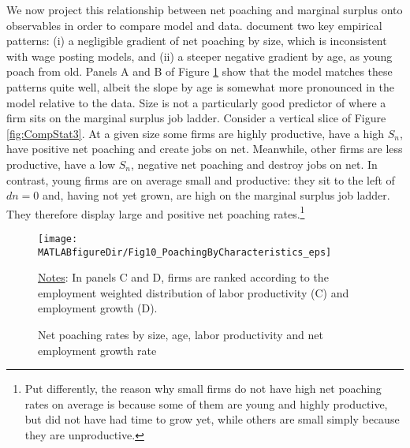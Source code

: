 We now project this relationship between net poaching and marginal surplus onto observables in order to compare model and data.
\citet{HHKM2018} document two key empirical patterns: (i) a negligible gradient of net poaching by size, which is inconsistent with wage posting models, and (ii) a steeper negative gradient by age, as young poach from old.
Panels A and B of Figure \ref{figure:J2J2} show that the model matches these patterns quite well, albeit the slope by age is somewhat more pronounced in the model relative to the data.
Size is not a particularly good predictor of where a firm sits on the marginal surplus job ladder.
Consider a vertical slice of Figure \ref{fig:CompStat3}.
At a given size some firms are highly productive, have a high $S_n$, have positive net poaching and create jobs on net.
Meanwhile, other firms are less productive, have a low $S_n$, negative net poaching and destroy jobs on net.
In contrast, young firms are on average small and productive: they sit to the left of $dn=0$ and, having not yet grown, are high on the marginal surplus job ladder.
They therefore display large and positive net poaching rates.\footnote{Put differently, the reason why small firms do not have high net poaching rates on average is because some of them are young and highly productive, but did not have had time to grow yet, while others are small simply because they are unproductive.}

\begin{figure}[ttt]
\begin{center}
\hspace*{-0.5cm}\texttt{[image: \\MATLABfigureDir/Fig10\_PoachingByCharacteristics\_eps]}
\caption{Net poaching rates by size, age, labor productivity and net employment growth rate}\label{figure:J2J2}\vspace*{-0.1cm}
\end{center}
\footnotesize{\underline{Notes}:
In panels C and D, firms are ranked according to the employment weighted distribution of labor productivity (C) and employment growth (D).
}
\end{figure}

